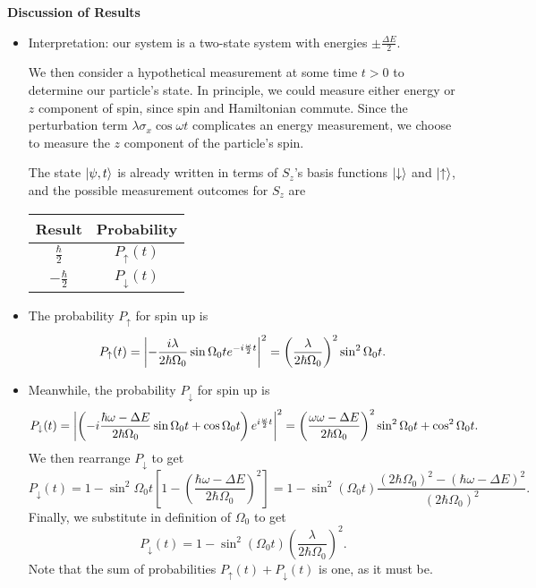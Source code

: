 \documentclass[11pt, a4paper]{article}
\newcommand{\Ham}{Hamiltonian\xspace}
\newcommand{\p}{\psi}  %
\newcommand{\ua}{\uparrow}  %
\newcommand{\da}{\downarrow}  %
\begin{document}
\textbf{Discussion of Results}
\begin{itemize}
	\item Interpretation: our system is a two-state system with energies $ \pm \frac{\Delta E}{2} $. 
	
	We then consider a hypothetical measurement at some time $ t > 0 $  to determine our particle's state. In principle, we could measure either energy or $ z $ component of spin, since spin and \Ham commute. Since the perturbation term $ \lambda \sigma_{x} \cos \omega t $ complicates an energy measurement, we choose to measure the $ z $ component of the particle's spin.
	
    The state $ \ket{\p, t} $ is already written in terms of $ S_{z} $'s basis functions $ \ket{\da} $ and $ \ket{\ua} $, and the possible measurement outcomes for $ S_{z} $ are
	
	\begin{center}
		\begin{tabular}{c|c}
			Result & Probability \\
			\hline {\rule{0pt}{2.6ex}} \hspace{-7pt}
			 $ \frac{\hbar}{2} $ & $ P_{\ua}(t) $\\
			$ -\frac{\hbar}{2} $ & $ P_{\da}(t) $
		\end{tabular}
	\end{center}
	
	\item The probability $ P_{\ua} $ for spin up is
	\begin{equation*}
		P_{\ua}(t) = \abs{-\frac{i\lambda}{2\hbar \Omega_{0}} \sin \Omega_{0}t e^{-i\frac{\omega}{2}t}}^{2} = \left(\frac{\lambda}{2\hbar\Omega_{0}}\right)^{2}\sin^{2}\Omega_{0}t.
	\end{equation*}
	\item Meanwhile, the probability $ P_{\da} $ for spin up is
	\begin{equation*}
		P_{\da}(t) = \abs{\left(-i\frac{\hbar \omega - \Delta E}{2\hbar\Omega_{0}} \sin \Omega_{0}t + \cos \Omega_{0}t\right)e^{i\frac{\omega}{2}t} }^{2} = \left(\frac{\omega \omega - \Delta E}{2\hbar \Omega_{0}}\right)^{2}\sin^{2}\Omega_{0}t + \cos^{2}\Omega_{0}t.
	\end{equation*}
    We then rearrange $ P_{\da} $ to get
	\begin{equation*}
        P_{\da}(t) = 1 - \sin^{2}\Omega_{0}t\left[1 - \left(\frac{\hbar \omega - \Delta E}{2\hbar \Omega_{0}}\right)^{2}\right] = 1 - \sin^{2}(\Omega_{0}t)\frac{(2\hbar \Omega_{0})^{2} - (\hbar \omega - \Delta E)^{2}}{(2\hbar \Omega_{0})^{2}}.
	\end{equation*}
	Finally, we substitute in definition of $ \Omega_{0} $ to get
	\begin{equation*}
        P_{\da}(t) = 1 - \sin^{2}(\Omega_{0}t)\left(\frac{\lambda}{2\hbar \Omega_{0}}\right)^{2}.
	\end{equation*}
	Note that the sum of probabilities $ P_{\ua}(t) + P_{\da}(t) $ is one, as it must be.
	

\end{itemize}
\end{document}
